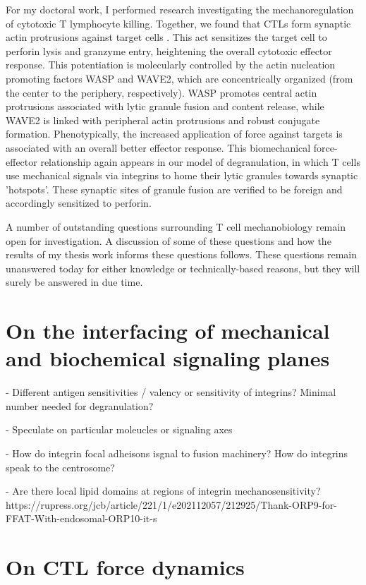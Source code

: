 For my doctoral work, I performed research investigating the mechanoregulation of cytotoxic T lymphocyte killing. Together, we found that CTLs form synaptic actin protrusions against target cells \cite{Tamzalit2018}. This act sensitizes the target cell to perforin lysis and granzyme entry, heightening the overall cytotoxic effector response. This potentiation is molecularly controlled by the actin nucleation promoting factors WASP and WAVE2, which are concentrically organized (from the center to the periphery, respectively). WASP promotes central actin protrusions associated with lytic granule fusion and content release, while WAVE2 is linked with peripheral actin protrusions and robust conjugate formation. Phenotypically, the increased application of force against targets is associated with an overall better effector response. This biomechanical force-effector relationship again appears in our model of degranulation, in which T cells use mechanical signals via integrins to home their lytic granules towards synaptic 'hotspots'. These synaptic sites of granule fusion are verified to be foreign and accordingly sensitized to perforin. 

A number of outstanding questions surrounding T cell mechanobiology remain open for investigation. A discussion of some of these questions and how the results of my thesis work informs these questions follows. These questions remain unanswered today for either knowledge or technically-based reasons, but they will surely be answered in due time.

\section{On the interfacing of mechanical and biochemical signaling planes}

- Different antigen sensitivities / valency or sensitivity of integrins? Minimal number needed for degranulation?

- Speculate on particular moleucles or signaling axes

- How do integrin focal adheisons isgnal to fusion machinery? How do integrins speak to the centrosome?

- Are there local lipid domains at regions of integrin mechanosensitivity? https://rupress.org/jcb/article/221/1/e202112057/212925/Thank-ORP9-for-FFAT-With-endosomal-ORP10-it-s

\section{On CTL force dynamics}

